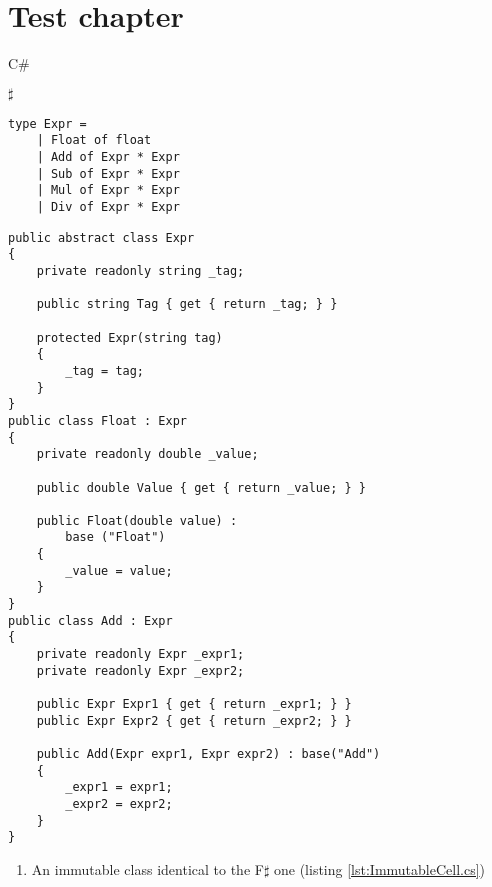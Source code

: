 \chapter{Test chapter}
\label{ch:test}

C\#

$\sharp$

\begin{lstlisting}[label=lst:discriminated-union, caption={Discriminated union in F$\sharp$}]
type Expr =
    | Float of float
    | Add of Expr * Expr
    | Sub of Expr * Expr
    | Mul of Expr * Expr
    | Div of Expr * Expr
\end{lstlisting}

\begin{lstlisting}[label=lst:discriminated-union-csharp, language=CSharp, caption={Simulating a discriminated union in C$\sharp$. The implementation of the \texttt{Sub}, \texttt{Mul}, and \texttt{Div} cases has been omitted for brevity.}]
public abstract class Expr
{
    private readonly string _tag;

    public string Tag { get { return _tag; } }

    protected Expr(string tag)
    {
        _tag = tag;
    }
}
public class Float : Expr
{
    private readonly double _value;

    public double Value { get { return _value; } }

    public Float(double value) : 
        base ("Float")
    {
        _value = value;
    }
}
public class Add : Expr
{
    private readonly Expr _expr1;
    private readonly Expr _expr2;

    public Expr Expr1 { get { return _expr1; } }
    public Expr Expr2 { get { return _expr2; } }

    public Add(Expr expr1, Expr expr2) : base("Add")
    {
        _expr1 = expr1;
        _expr2 = expr2;
    }
}
\end{lstlisting}

\begin{enumerate}
\item An immutable class identical to the F$\sharp$ one (listing \ref{lst:ImmutableCell.cs})
\end{enumerate}

